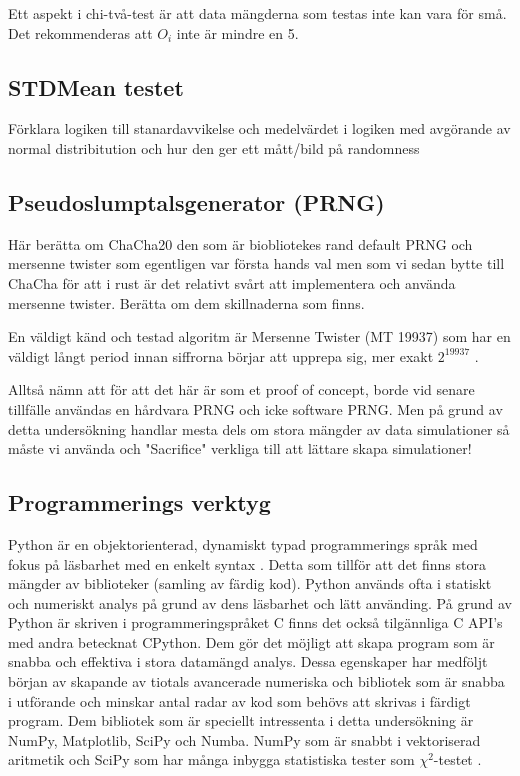 \documentclass[swedish,a4paper]{article}
\begin{document}
Ett aspekt i chi-två-test är att data mängderna som testas inte kan vara för små. Det rekommenderas att $O_i$ inte är mindre en 5.

\subsection{STDMean testet}
Förklara logiken till stanardavvikelse och medelvärdet
i logiken med avgörande av normal distribitution och hur den ger ett mått/bild på randomness

\subsection{Pseudoslumptalsgenerator (PRNG)}
Här berätta om ChaCha20 \parencite{chacha} den som är biobliotekes rand
\parencite{rand_crate} default PRNG och mersenne twister som egentligen var första
hands val
\parencite{mersenne_twister} men som vi sedan bytte till ChaCha för att i rust
är det relativt svårt att  implementera och använda mersenne twister. Berätta om
dem skillnaderna som finns.


En väldigt känd och testad algoritm är Mersenne Twister (MT 19937) som
har en väldigt långt period innan siffrorna börjar att upprepa sig, mer
exakt $2^{19937}$ \parencite{mersenne_twister}.

Alltså nämn att för att det här är som et proof of concept, borde vid
senare tillfälle användas en hårdvara PRNG och icke software PRNG.
Men på grund av detta undersökning handlar mesta dels om stora mängder av data
simulationer så måste vi använda och "Sacrifice" verkliga till att lättare
skapa simulationer!

\subsection{Programmerings verktyg}
\label{sec:verktyg}
Python är en objektorienterad, dynamiskt typad programmerings språk med
fokus på läsbarhet med en enkelt syntax \parencite{python}. Detta  som tillför att det finns stora
mängder av biblioteker (samling av färdig kod).
Python används ofta i statiskt och numeriskt analys på grund av dens
läsbarhet och lätt använding. På grund av Python är skriven i
programmeringspråket C finns det också tilgännliga C API's med andra
betecknat CPython. Dem gör det möjligt att skapa program som är snabba
och effektiva i stora datamängd analys. Dessa egenskaper har medföljt
början av skapande av tiotals avancerade numeriska och
bibliotek som är snabba i utförande och minskar antal radar av kod som
behövs att skrivas i färdigt program. Dem bibliotek som är speciellt
intressenta i detta undersökning är NumPy, Matplotlib, SciPy och Numba.
NumPy som är snabbt i vektoriserad aritmetik och SciPy som har många
inbygga statistiska tester som $\chi^2$-testet \parencite{numpy, scipy}.
\end{document}
